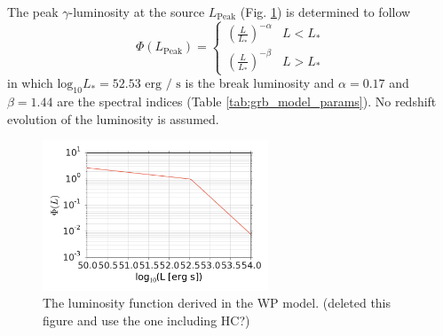 The peak $\gamma$-luminosity at the source
$L_{\text{Peak}}$ (Fig. \ref{fig:Lpeak})  is determined to follow
\begin{equation}
\label{eq:Phi_L}
 \Phi(L_{\text{Peak}}) = \begin{cases}
      \left(\frac{L}{L_{*}} \right)^{-\alpha} &  L < L_{*} \\
      \left(\frac{L}{L_{*}} \right)^{-\beta}  &  L > L_{*}
     \end{cases}
\end{equation}
in which $\text{log}_{10}L_{*}=52.53 \text{ erg / s}$ is the break luminosity
and $\alpha=0.17$ and $\beta=1.44$ are the spectral indices (Table
\ref{tab:grb_model_params}).
No redshift evolution of the luminosity is assumed.
\begin{figure}[h]
 \captionsetup{width=.6\textwidth}
 \centering
 \includegraphics[width=0.6\textwidth]{fig/Lpeak_wp.pdf}
 \caption{The luminosity function derived in the WP model. (deleted this figure 
and use the one including HC?)}
 \label{fig:Lpeak}
\end{figure}